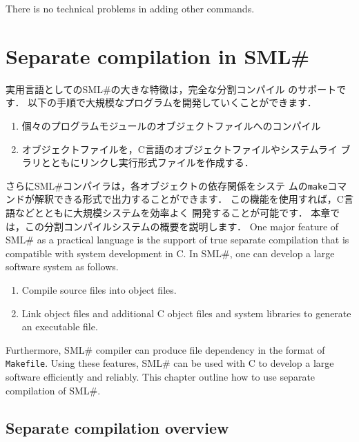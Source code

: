 \documentclass{jbook}
\newcommand{\txt}[2]{#2}
\newcommand{\smlsharp}{SML\#}
\begin{document}
	There is no technical problems in adding other commands.
\fi%

\chapter{
\txt{\smlsharp{}分割コンパイルシステム}
 {Separate compilation in \smlsharp{}}
}
\label{chap:tutorialSeparatecompilation}

\ifx\jp%
	実用言語としての\smlsharp{}の大きな特徴は，完全な分割コンパイル
のサポートです．
	以下の手順で大規模なプログラムを開発していくことができます．
\begin{enumerate}
\item 個々のプログラムモジュールのオブジェクトファイルへのコンパイル
\item オブジェクトファイルを，C言語のオブジェクトファイルやシステムライ
ブラリとともにリンクし実行形式ファイルを作成する．
\end{enumerate}
	さらに\smlsharp{}コンパイラは，各オブジェクトの依存関係をシステ
ムの{\tt make}コマンドが解釈できる形式で出力することができます．
	この機能を使用すれば，C言語などとともに大規模システムを効率よく
開発することが可能です．
	本章では，この分割コンパイルシステムの概要を説明します．
\else%
	One major feature of \smlsharp{} as a practical language is the
support of  true separate compilation that is compatible with system
development in C.
	In \smlsharp{}, one can develop a large software system as follows.
\begin{enumerate}
\item Compile source files into object files.
\item Link object files and additional C object files and system
libraries to generate an executable file.
\end{enumerate}
	Furthermore, \smlsharp{} compiler can produce file dependency in
the format of {\tt Makefile}.
	Using these features, \smlsharp{} can be used with C to develop
a large software efficiently and reliably.
	This chapter outline how to use separate compilation of \smlsharp.
\fi%

\section{\txt{分割コンパイルの概要}{Separate compilation overview}}
\label{sec:tutorialSeparateCompilation}
\end{document}

